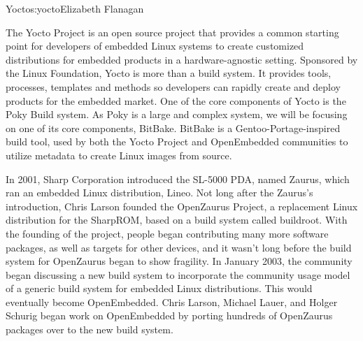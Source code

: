 \begin{aosachapter}{Yocto}{s:yocto}{Elizabeth Flanagan}


%
%

The Yocto Project\textsuperscript{\texttrademark} is an open source
project that provides a common starting point for
developers of embedded Linux systems to create customized
distributions for embedded products in a hardware-agnostic
setting. Sponsored by the Linux Foundation, Yocto is more than a
build system. It provides tools, processes, templates and methods so
developers can rapidly create and deploy products for the embedded
market. One of the core components of Yocto is the Poky Build
system. As Poky is a large and complex system, we will be focusing on
one of its core components, BitBake.  BitBake is a Gentoo-Portage-inspired 
build tool, used by both the Yocto Project and OpenEmbedded
communities to utilize metadata to create Linux images from
source.

In 2001, Sharp Corporation introduced the SL-5000 PDA, named Zaurus,
which ran an embedded Linux distribution, Lineo. Not long after the
Zaurus's introduction, Chris Larson founded the OpenZaurus Project, a
replacement Linux distribution for the SharpROM, based on a build
system called buildroot. With the founding of the project, people
began contributing many more software packages, as well as targets for
other devices, and it wasn't long before the build system for OpenZaurus
began to show fragility. In January 2003, the community began
discussing a new build system to incorporate the community usage model
of a generic build system for embedded Linux distributions. This would
eventually become OpenEmbedded. Chris Larson, Michael Lauer, and
Holger Schurig began work on OpenEmbedded by porting hundreds of
OpenZaurus packages over to the new build system.


\end{aosachapter}
